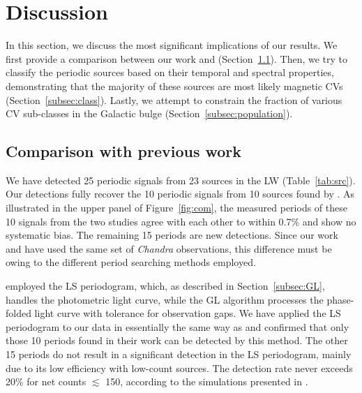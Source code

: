 \documentclass[fleqn,usenatbib]{mnras}
\begin{document}
%


\section{Discussion}\label{sec:discussion}
In this section, we discuss the most significant implications of our results. We first provide a comparison between our work and \cite{2012ApJ...746..165H} (Section~\ref{subsec:compare}). Then, we try to classify the periodic sources based on their temporal and spectral properties, demonstrating that the majority of these sources are most likely magnetic CVs (Section~\ref{subsec:class}). Lastly, we attempt to constrain the fraction of various CV sub-classes in the Galactic bulge (Section~\ref{subsec:population}).

\subsection{Comparison with previous work} \label{subsec:compare}
We have detected 25 periodic signals from 23 sources in the LW (Table~\ref{tab:src}). 
Our detections fully recover the 10 periodic signals from 10 sources found by \cite{2012ApJ...746..165H}. 
As illustrated in the upper panel of Figure~\ref{fig:com}, the measured periods of these 10 signals from the two studies agree with each other to within 0.7\% and show no systematic bias.
The remaining 15 periods are new detections. 
Since our work and \cite{2012ApJ...746..165H} have used the same set of {\it Chandra} observations, 
this difference must be owing to the different period searching methods employed.

\cite{2012ApJ...746..165H} employed the LS periodogram,
which, as described in Section~\ref{subsec:GL}, handles the photometric light curve, while the GL algorithm processes the phase-folded light curve with tolerance for observation gaps. We have applied the LS periodogram to our data in essentially the same way as \cite{2012ApJ...746..165H} and confirmed that only those 10 periods found in their work can be detected by this method. 
The other 15 periods do not result in a significant detection in the LS periodogram, mainly due to its low efficiency with low-count sources.
The detection rate 
never exceeds 20\% for net counts $\lesssim$ 150, according to the simulations presented in \citet[figure 7 therein]{2012ApJ...746..165H}.
\end{document}
